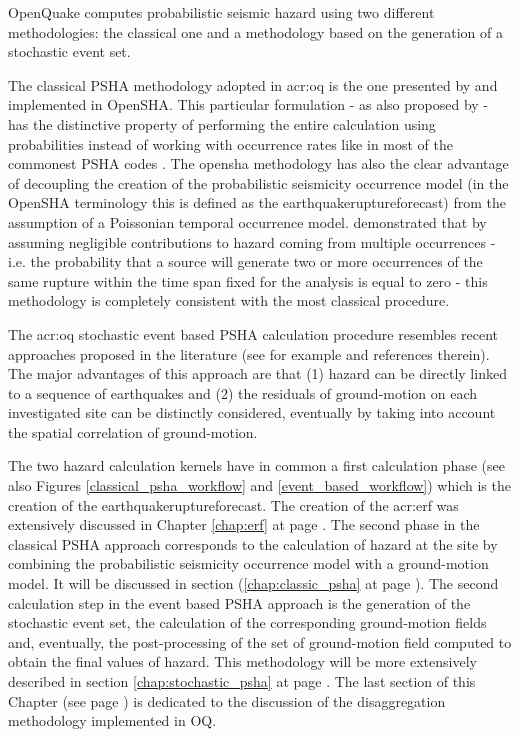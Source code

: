 OpenQuake computes probabilistic seismic hazard using two different 
methodologies: the classical one and a methodology based on the 
generation of a stochastic event set.

The classical PSHA methodology adopted in \gls{acr:oq} is the one 
presented by \citet{field2003} and implemented in OpenSHA. 
This particular formulation - as also proposed by \citet{chiang1984} - 
has the distinctive property of performing the entire calculation using 
probabilities instead of working with occurrence rates like in most 
of the commonest PSHA codes \citep[see for instance][]{bender1987}. 
%
The \gls{opensha} methodology has also the clear advantage of decoupling the 
creation of the probabilistic seismicity occurrence model (in the OpenSHA 
terminology this is defined as the \gls{earthquakeruptureforecast}) from the 
assumption of a Poissonian temporal occurrence model. 
%
\citet{field2003} demonstrated that by assuming negligible contributions to 
hazard coming from multiple occurrences - i.e. the probability that a source 
will generate two or more occurrences of the same rupture within the time 
span fixed for the analysis is equal to zero - this methodology is 
completely consistent with the most classical procedure.

The \gls{acr:oq} stochastic event based PSHA calculation procedure 
resembles recent approaches proposed in the literature (see for example 
\citet{musson2000} and references therein). 
%
The major advantages of this approach are that (1) hazard can be directly 
linked to a sequence of earthquakes and (2) the residuals of ground-motion 
on each investigated site can be distinctly considered, eventually by 
taking into account the spatial correlation of ground-motion.

The two hazard calculation kernels have in common a first calculation 
phase (see also Figures \ref{classical_psha_workflow} and 
\ref{event_based_workflow}) which is the creation of the 
\gls{earthquakeruptureforecast}. 
The creation of the \gls{acr:erf} was extensively discussed in Chapter 
\ref{chap:erf} at page \pageref{chap:erf}.
%
The second phase in the classical PSHA approach corresponds to the 
calculation of hazard at the site by combining the probabilistic 
seismicity occurrence model with a ground-motion model. 
It will be discussed in section (\ref{chap:classic_psha} 
at page \pageref{chap:classic_psha}).
%
The second calculation step in the event based PSHA approach is the 
generation of the stochastic event set, the calculation of the 
corresponding ground-motion fields and, eventually, the post-processing 
of the set of ground-motion field computed to obtain the final values 
of hazard. This methodology will be more extensively described in section 
\ref{chap:stochastic_psha} at page \pageref{chap:stochastic_psha}.
%
The last section of this Chapter (see page \pageref{sec:disaggregation}) 
is dedicated to the discussion of the disaggregation methodology implemented 
in OQ.
